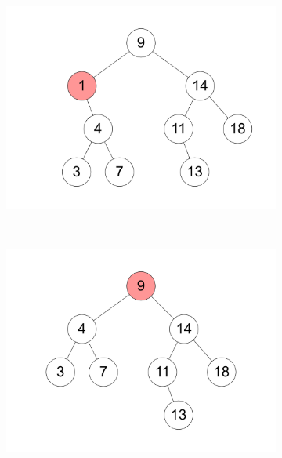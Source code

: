 \documentclass[11pt,a4paper]{article}
\begin{document}
\begin{loesung}
\begin{enumerate}
\begin{figure}[h!]
\begin{subfigure}[b]{0.3\textwidth}
                \includegraphics[width=\textwidth]{img/2d_2}
            \end{subfigure}
            \\
            \begin{subfigure}[b]{0.3\textwidth}
                \centering
                \includegraphics[width=\textwidth]{img/2d_3}
            \end{subfigure}
            \begin{subfigure}[b]{0.3\textwidth}
                \centering

\end{subfigure}
\end{figure}
\end{enumerate}
\end{loesung}
\end{document}
